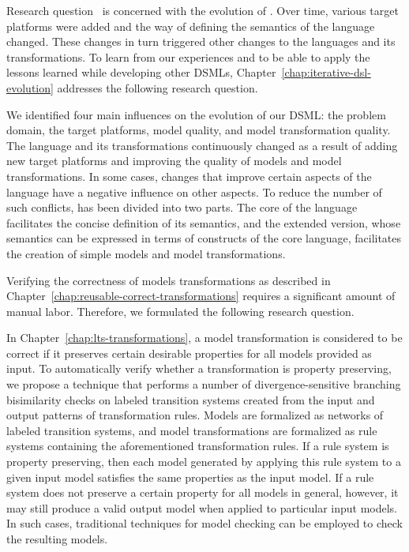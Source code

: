 Research question~ is concerned with the evolution of \SLCO.
Over time, various target platforms were added and the way of defining the semantics of the language changed.
These changes in turn triggered other changes to the languages and its transformations.
To learn from our experiences and to be able to apply the lessons learned while developing other DSMLs, Chapter~\ref{chap:iterative-dsl-evolution} addresses the following research question.

\RQFive

\noindent

We identified four main influences on the evolution of our DSML: the problem domain, the target platforms, model quality, and model transformation quality.
The language and its transformations continuously changed as a result of adding new target platforms and improving the quality of models and model transformations.
In some cases, changes that improve certain aspects of the language have a negative influence on other aspects.
To reduce the number of such conflicts, \SLCO has been divided into two parts.
The core of the language facilitates the concise definition of its semantics, and the extended version, whose semantics can be expressed in terms of constructs of the core language, facilitates the creation of simple models and model transformations.


Verifying the correctness of models transformations as described in Chapter~\ref{chap:reusable-correct-transformations} requires a significant amount of manual labor.
Therefore, we formulated the following research question.

\RQSix

\noindent
In Chapter~\ref{chap:lts-transformations}, a model transformation is considered to be correct if it preserves certain desirable properties for all models provided as input.
To automatically verify whether a transformation is property preserving, we propose a technique that performs a number of divergence-sensitive branching bisimilarity checks on labeled transition systems created from the input and output patterns of transformation rules.
Models are formalized as networks of labeled transition systems, and model transformations are formalized as rule systems containing the aforementioned transformation rules.
If a rule system is property preserving, then each model generated by applying this rule system to a given input model satisfies the same properties as the input model.
If a rule system does not preserve a certain property for all models in general, however, it may still produce a valid output model when applied to particular input models.
In such cases, traditional techniques for model checking can be employed to check the resulting models.

